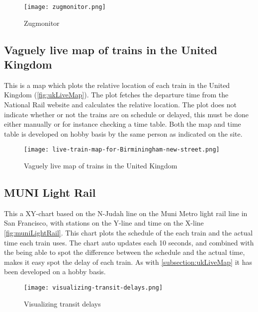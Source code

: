 \begin{figure}[!htbp]
	\texttt{[image: zugmonitor.png]}
	\caption[Zugmonitor]{Zugmonitor \cite{zugmonitor}}
	\label{fig:zugmonitor}
\end{figure}
\pagebreak

\subsection{Vaguely live map of trains in the United Kingdom}
\label{subsection:ukLiveMap}

This is a map which plots the relative location of each train in the United
Kingdom (\vref{fig:ukLiveMap}). The plot fetches the departure time from the 
National Rail website and calculates the relative location. The plot does not
indicate whether or not the trains are on schedule or delayed, this must be
done either manually or for instance checking a time table\cite{ukLiveMap}.
Both the map and time table is developed on hobby basis by the same person as
indicated on the site. 

\begin{figure}[!htbp]
	\texttt{[image: live-train-map-for-Birminingham-new-street.png]}
	\caption[Vaguely live map of trains in the United Kingdom]{Vaguely live map of trains in the United Kingdom \cite{ukLiveMap}}
	\label{fig:ukLiveMap}
\end{figure}
\pagebreak

\subsection{MUNI Light Rail}
\label{subsection:muniLightRail}

This a XY-chart based on the N-Judah line on the Muni Metro light rail line in 
San Francisco, with stations on the Y-line and time on the X-line \vref{fig:muniLightRail}. 
This chart plots the schedule of the each train and the actual time each train 
uses. The chart auto updates each 10 seconds, and combined with the being able 
to spot the difference between the schedule and the actual time, makes it easy 
spot the delay of each train. As with \vref{subsection:ukLiveMap} it has been 
developed on a hobby basis.

\begin{figure}[!htbp]
	\texttt{[image: visualizing-transit-delays.png]}
	\caption[Visualizing transit delays]{Visualizing transit delays \cite{muniLightRail}}
	\label{fig:muniLightRail}
\end{figure}
\pagebreak

